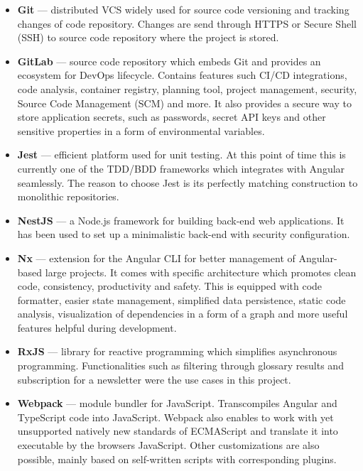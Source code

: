 \documentclass{article} %
\begin{document}
\begin{itemize}
    \item \textbf{Git} --- distributed VCS widely used for source code versioning and tracking changes of code repository. Changes are send through HTTPS or Secure Shell (SSH) to source code repository where the project is stored.
    \item \textbf{GitLab} --- source code repository which embeds Git and provides an ecosystem for DevOps lifecycle. Contains features such CI/CD integrations, code analysis, container registry, planning tool, project management, security, Source Code Management (SCM) and more. It also provides a secure way to store application secrets, such as passwords, secret API keys and other sensitive properties in a form of environmental variables.
    \item \textbf{Jest} --- efficient platform used for unit testing. At this point of time this is currently one of the TDD/BDD frameworks which integrates with Angular seamlessly. The reason to choose Jest is its perfectly matching construction to monolithic repositories.
    \item \textbf{NestJS} --- a Node.js framework for building back-end web applications. It has been used to set up a minimalistic back-end with security configuration.
    \item \textbf{Nx} --- extension for the Angular CLI for better management of Angular-based large projects. It comes with specific architecture which promotes clean code, consistency, productivity and safety. This is equipped with code formatter, easier state management, simplified data persistence, static code analysis, visualization of dependencies in a form of a graph and more useful features helpful during development.
    \item \textbf{RxJS} --- library for reactive programming which simplifies asynchronous programming. Functionalities such as filtering through glossary results and subscription for a newsletter were the use cases in this project.
    \item \textbf{Webpack} --- module bundler for JavaScript. Transcompiles Angular and TypeScript code into JavaScript. Webpack also enables to work with yet unsupported natively new standards of ECMAScript and translate it into executable by the browsers JavaScript. Other customizations are also possible, mainly based on self-written scripts with corresponding plugins.
\end{itemize}
\end{document}
